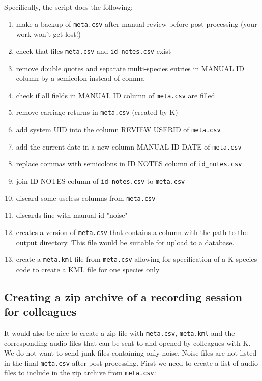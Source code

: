 \documentclass[English, 11pt, twoside, authoryear]{article}
\begin{document}
Specifically, the script does the following:
\begin{enumerate}
\item make a backup of \texttt{meta.csv} after manual review before post-processing (your work won't get lost!)
\item check that files \texttt{meta.csv} and \texttt{id\_notes.csv} exist
\item remove double quotes and separate multi-species entries in MANUAL ID column by a semicolon instead of comma
\item check if all fields in MANUAL ID column of \texttt{meta.csv} are filled
\item remove carriage returns in \texttt{meta.csv} (created by \textsf{K})
\item add system UID into the column REVIEW USERID of \texttt{meta.csv}
\item add the current date in a new column MANUAL ID DATE of \texttt{meta.csv}
\item replace commas with semicolons in ID NOTES column of \texttt{id\_notes.csv}
\item join ID NOTES column of \texttt{id\_notes.csv} to \texttt{meta.csv}
\item discard some useless columns from \texttt{meta.csv}
\item discards line with manual id "noise"
\item creates a version of \texttt{meta.csv} that contains a column with the path to the output directory. This file would be suitable for upload to a database.
\item create a \texttt{meta.kml} file from \texttt{meta.csv} allowing for specification of a \textsf{K} species code to create a KML file for one species only
\end{enumerate}


%
%
\subsection{Creating a zip archive of a recording session for colleagues}
%
%
It would also be nice to create a zip file with \texttt{meta.csv}, \texttt{meta.kml} and the corresponding audio files that can be sent to and opened by colleagues with \textsf{K}. We do not want to send junk files containing only noise. Noise files are not listed in the final \texttt{meta.csv} after post-processing. First we need to create a list of audio files to include in the zip archive from \texttt{meta.csv}:
\end{document}
